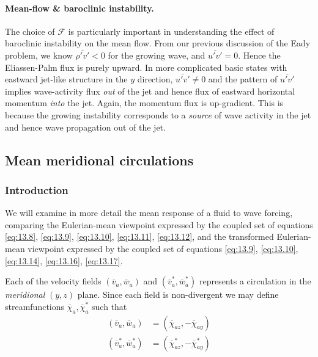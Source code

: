 \documentclass{jknotes}
\begin{document}
\paragraph{Mean-flow \& baroclinic instability.}
The choice of $\mathcal{F}$ is particularly important in understanding the
effect of baroclinic instability on the mean flow. From our previous
discussion of the Eady problem, we know $\overline{\rho'v'} < 0$ for the
growing wave, and $\overline{u'v'} = 0$. Hence the Eliassen-Palm flux is
purely upward. In more complicated basic states with eastward jet-like
structure in the $y$ direction, $\overline{u'v'} \ne 0$ and the pattern of
$\overline{u'v'}$ implies wave-activity flux \emph{out} of the jet and hence
flux of eastward horizontal momentum \emph{into} the jet. Again, the momentum
flux is up-gradient. This is because the growing instability corresponds to a
\emph{source} of wave activity in the jet and hence wave propagation out of
the jet.

\subsection{Mean meridional circulations}
\subsubsection{Introduction}
We will examine in more detail the mean response of a fluid to wave forcing,
comparing the Eulerian-mean viewpoint expressed by the coupled set of
equations \eqref{eq:13.8}, \eqref{eq:13.9}, \eqref{eq:13.10},
\eqref{eq:13.11}, \eqref{eq:13.12}, and the transformed Eulerian-mean
viewpoint expressed by the coupled set of equations \eqref{eq:13.9},
\eqref{eq:13.10}, \eqref{eq:13.14}, \eqref{eq:13.16}, \eqref{eq:13.17}.

Each of the velocity fields $(\overline{v}_a, \overline{w}_a)$ and
$(\overline{v}_a^*, \overline{w}_a^*)$ represents a circulation in the
\emph{meridional} $(y,z)$ plane. Since each field is non-divergent we may
define streamfunctions $\overline{\chi}_a, \overline{\chi}_a^*$ such that
\begin{align}
	(\overline{v}_a, \overline{w}_a) &=
	(\overline{\chi}_{az},-\overline{\chi}_{ay}) \\
	(\overline{v}_a^*, \overline{w}_a^*) &=
	(\overline{\chi}_{az}^*,-\overline{\chi}_{ay}^*)
\end{align}
\end{document}
